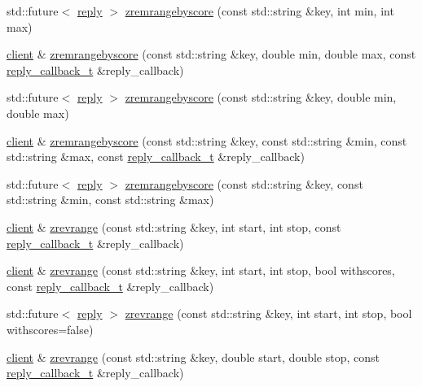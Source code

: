 \begin{DoxyCompactItemize}
std\+::future$<$ \hyperlink{classcpp__redis_1_1reply}{reply} $>$ \hyperlink{classcpp__redis_1_1client_a1317e67f2993b71bce596d28bce009b9}{zremrangebyscore} (const std\+::string \&key, int min, int max)
\item 
\hyperlink{classcpp__redis_1_1client}{client} \& \hyperlink{classcpp__redis_1_1client_a62354f918bcc9fd99562f1fe25dadec7}{zremrangebyscore} (const std\+::string \&key, double min, double max, const \hyperlink{classcpp__redis_1_1client_a061a1140d36d2eaeda82b09a0bb3f9f2}{reply\+\_\+callback\+\_\+t} \&reply\+\_\+callback)
\item 
std\+::future$<$ \hyperlink{classcpp__redis_1_1reply}{reply} $>$ \hyperlink{classcpp__redis_1_1client_ab40737e3dd44d39d708ab9e545f1d068}{zremrangebyscore} (const std\+::string \&key, double min, double max)
\item 
\hyperlink{classcpp__redis_1_1client}{client} \& \hyperlink{classcpp__redis_1_1client_a4a9c526f56dc158345f359961c9f9a7d}{zremrangebyscore} (const std\+::string \&key, const std\+::string \&min, const std\+::string \&max, const \hyperlink{classcpp__redis_1_1client_a061a1140d36d2eaeda82b09a0bb3f9f2}{reply\+\_\+callback\+\_\+t} \&reply\+\_\+callback)
\item 
std\+::future$<$ \hyperlink{classcpp__redis_1_1reply}{reply} $>$ \hyperlink{classcpp__redis_1_1client_afdef5244240e2c54c9738be66807e8f6}{zremrangebyscore} (const std\+::string \&key, const std\+::string \&min, const std\+::string \&max)
\item 
\hyperlink{classcpp__redis_1_1client}{client} \& \hyperlink{classcpp__redis_1_1client_ad408a62269d10de02605de9acec1ddc0}{zrevrange} (const std\+::string \&key, int start, int stop, const \hyperlink{classcpp__redis_1_1client_a061a1140d36d2eaeda82b09a0bb3f9f2}{reply\+\_\+callback\+\_\+t} \&reply\+\_\+callback)
\item 
\hyperlink{classcpp__redis_1_1client}{client} \& \hyperlink{classcpp__redis_1_1client_a37bfbe4848350144e7899c6d1e63653b}{zrevrange} (const std\+::string \&key, int start, int stop, bool withscores, const \hyperlink{classcpp__redis_1_1client_a061a1140d36d2eaeda82b09a0bb3f9f2}{reply\+\_\+callback\+\_\+t} \&reply\+\_\+callback)
\item 
std\+::future$<$ \hyperlink{classcpp__redis_1_1reply}{reply} $>$ \hyperlink{classcpp__redis_1_1client_a001bdf0f597d386202b0aab116657055}{zrevrange} (const std\+::string \&key, int start, int stop, bool withscores=false)
\item 
\hyperlink{classcpp__redis_1_1client}{client} \& \hyperlink{classcpp__redis_1_1client_a7b20d0dc47cf4fb40220e51408876d6d}{zrevrange} (const std\+::string \&key, double start, double stop, const \hyperlink{classcpp__redis_1_1client_a061a1140d36d2eaeda82b09a0bb3f9f2}{reply\+\_\+callback\+\_\+t} \&reply\+\_\+callback)

\end{DoxyCompactItemize}
